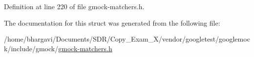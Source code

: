 Definition at line 220 of file gmock-\/matchers.\+h.



The documentation for this struct was generated from the following file\+:\begin{DoxyCompactItemize}
\item 
/home/bhargavi/\+Documents/\+S\+D\+R/\+Copy\+\_\+\+Exam\+\_\+X/vendor/googletest/googlemock/include/gmock/\hyperlink{gmock-matchers_8h}{gmock-\/matchers.\+h}\end{DoxyCompactItemize}
